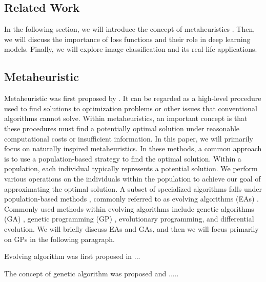 \begin{ZhChapter}
    \chapter{Related Work}
    In the following section, we will introduce the concept of metaheuristics \cite{yang2010nature,yang2011metaheuristic} . Then, we will discuss the importance of loss functions and their role in deep learning \cite{deepLearning} models. Finally, we will explore image classification and its real-life applications.

    \section{Metaheuristic}
    Metaheuristic \cite{glover1986future} was first proposed by \citeauthor{glover1986future}. It can be regarded as a high-level procedure used to find solutions to optimization problems or other issues that conventional algorithms cannot solve. Within metaheuristics, an important concept is that these procedures must find a potentially optimal solution under reasonable computational costs or insufficient information. In this paper, we will primarily focus on naturally inspired metaheuristics. In these methods, a common approach is to use a population-based strategy to find the optimal solution. Within a population, each individual typically represents a potential solution. We perform various operations on the individuals within the population to achieve our goal of approximating the optimal solution. A subset of specialized algorithms falls under population-based methods \cite{enwiki:1255593755}, commonly referred to as evolving algorithms (EAs) \cite{muhlenbein1988evolution}. Commonly used methods within evolving algorithms include genetic algorithms (GA) \cite{kumar2010genetic}, genetic programming (GP) \cite{geneticProgramming} , evolutionary programming, and differential evolution. We will briefly discuss EAs and GAs, and then we will focus primarily on GPs in the following paragraph.

    Evolving algorithm was first proposed in ...

    The concept of genetic algorithm was proposed and .....


\end{ZhChapter}
